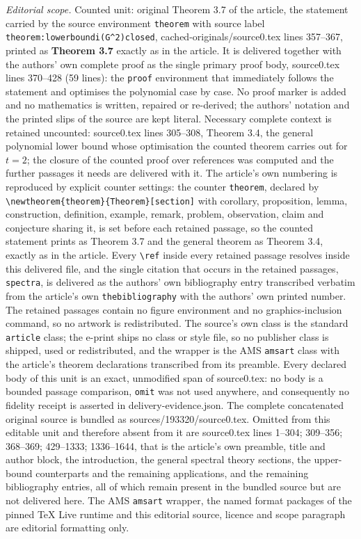 \documentclass[10pt,a4paper]{amsart}
\theoremstyle{definition}
\begin{document}
\noindent\textit{Editorial scope.} Counted unit: original Theorem 3.7 of the article, the statement carried by the source environment \texttt{theorem} with source label \texttt{theorem:lowerboundi(G\textasciicircum 2)closed}, cached-originals/source0.tex lines 357--367, printed as \textbf{Theorem 3.7} exactly as in the article. It is delivered together with the authors' own complete proof as the single primary proof body, source0.tex lines 370--428 (59 lines): the \texttt{proof} environment that immediately follows the statement and optimises the polynomial case by case. No proof marker is added and no mathematics is written, repaired or re-derived; the authors' notation and the printed slips of the source are kept literal. Necessary complete context is retained uncounted: source0.tex lines 305--308, Theorem 3.4, the general polynomial lower bound whose optimisation the counted theorem carries out for $t=2$; the closure of the counted proof over references was computed and the further passages it needs are delivered with it. The article's own numbering is reproduced by explicit counter settings: the counter \texttt{theorem}, declared by \texttt{\textbackslash newtheorem\{theorem\}\{Theorem\}[section]} with corollary, proposition, lemma, construction, definition, example, remark, problem, observation, claim and conjecture sharing it, is set before each retained passage, so the counted statement prints as Theorem 3.7 and the general theorem as Theorem 3.4, exactly as in the article. Every \texttt{\textbackslash ref} inside every retained passage resolves inside this delivered file, and the single citation that occurs in the retained passages, \texttt{spectra}, is delivered as the authors' own bibliography entry transcribed verbatim from the article's own \texttt{thebibliography} with the authors' own printed number. The retained passages contain no figure environment and no graphics-inclusion command, so no artwork is redistributed. The source's own class is the standard \texttt{article} class; the e-print ships no class or style file, so no publisher class is shipped, used or redistributed, and the wrapper is the AMS \texttt{amsart} class with the article's theorem declarations transcribed from its preamble. Every declared body of this unit is an exact, unmodified span of source0.tex: no body is a bounded passage comparison, \texttt{omit} was not used anywhere, and consequently no fidelity receipt is asserted in delivery-evidence.json. The complete concatenated original source is bundled as sources/193320/source0.tex. Omitted from this editable unit and therefore absent from it are source0.tex lines 1--304; 309--356; 368--369; 429--1333; 1336--1644, that is the article's own preamble, title and author block, the introduction, the general spectral theory sections, the upper-bound counterparts and the remaining applications, and the remaining bibliography entries, all of which remain present in the bundled source but are not delivered here. The AMS \texttt{amsart} wrapper, the named format packages of the pinned TeX Live runtime and this editorial source, licence and scope paragraph are editorial formatting only.\par\smallskip
\end{document}
